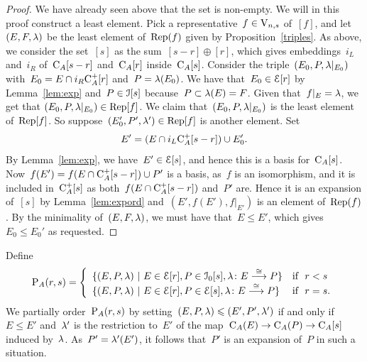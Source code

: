 \begin{proof}
We have already seen above that the set is non-empty. We will in this proof construct a least element. Pick a representative~$f\in \mathrm{V}_{n,s}$ of~$[f]$, and let~$(E,F,\lambda)$ be the least element of~$\operatorname{Rep}(f)$ given by Proposition~\ref{triples}. As above, we consider the set~$[s]$ as the sum~$[s-r]\oplus [r]$, which gives embeddings~$i_L$ and~$i_R$  of~$\mathrm{C}_A[s-r]$ and~$\mathrm{C}_A[r]$ inside~$\mathrm{C}_A[s]$. 
Consider the triple~$(E_0,P,\lambda|_{E_0})$ with~$E_0=E\cap i_R\mathrm{C}_A^+[r]$ and~$P=\lambda(E_0)$. We have that~$E_0\in \mathcal{E}[r]$ by Lemma~\ref{lem:exp} and~$P\in \mathcal{I}[s]$ because~$P\subset \lambda(E)=F$. Given that~$f|_E=\lambda$, we get that 
$(E_0,P,\lambda|_{E_0})\in \operatorname{Rep}[f]$. We claim that~$(E_0,P,\lambda|_{E_0})$ is the least element of~$\operatorname{Rep}[f]$. So suppose~$(E_0',P',\lambda')\in \operatorname{Rep}[f]$ is another element. Set~$$E'=(E\cap i_L\mathrm{C}_A^+[s-r])\cup E_0'.$$ By Lemma~\ref{lem:exp}, we have~$E'\in \mathcal{E}[s]$, and hence this is a basis for~$\mathrm{C}_A[s]$. 
Now~$f(E')=f(E\cap \mathrm{C}_A^+[s-r])\cup P'$ is a basis, as~$f$ is an isomorphism, and it is included in~$\mathrm{C}_A^+[s]$ as both~$f(E\cap \mathrm{C}_A^+[s-r])$  and~$P'$ are. Hence it is an expansion of~$[s]$ by Lemma~\ref {lem:expord} and~$(E',f(E'),f|_{E'})$ is an element of~$\operatorname{Rep}(f)$. By the minimality of~$(E,F,\lambda)$, we must have that~$E\le E'$, which gives~$E_0\le E_0'$ as requested. 
\end{proof}


Define 
$$\mathrm{P}_A(r,s)=\left\{ \begin{array}{ll} \{(E,P,\lambda)\ |\ E\in\mathcal{E}[r], P\in\mathcal{I}_0[s], \lambda\colon E\stackrel{\cong}{\longrightarrow} P\}  & \textrm{if}\ \ r<s\\
\{(E,P,\lambda)\ |\ E\in\mathcal{E}[r], P\in\mathcal{E}[s], \lambda\colon E\stackrel{\cong}{\longrightarrow} P\}  & \textrm{if}\ \ r=s. \end{array}\right.$$
We partially order~$\mathrm{P}_A(r,s)$ by setting~\hbox{$(E,P,\lambda)\leqslant (E',P',\lambda')$} if and only if~$E\le E'$ and~$\lambda'$ is the restriction to~$E'$ of the map~$\mathrm{C}_A(E)\to \mathrm{C}_A(P)\to \mathrm{C}_A[s]$ induced by~$\lambda$. As~$P'=\lambda'(E')$, it follows that~$P'$ is an expansion of~$P$ in such a situation.

